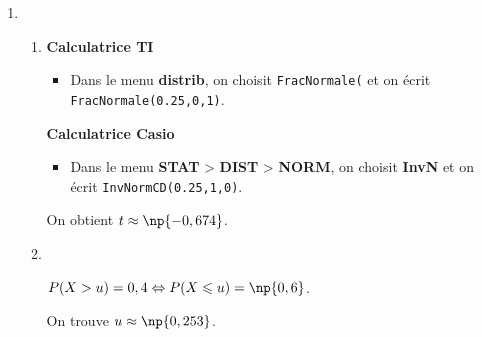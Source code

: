 \documentclass{cornouaille}
\begin{document}
\begin{methode}
\begin{enumerate}
\item
\begin{enumerate}
\item \begin{multicols}{2}
\textcolor{H1}{\bfseries Calculatrice TI}
\begin{itemize}
\item \raggedright%
  Dans le menu
  \textbf{distrib}, %
    on choisit \verb"FracNormale(" et on écrit \verb"FracNormale(0.25,0,1)".
\end{itemize}

\columnbreak

\textcolor{H1}{\bfseries Calculatrice Casio}
\begin{itemize}
  \item \raggedright Dans le menu %
    \textbf{STAT} > \textbf{DIST} > \textbf{NORM}, on choisit
    \textbf{InvN} et on écrit \verb"InvNormCD(0.25,1,0)".
\end{itemize}
\end{multicols}
On obtient $t\approx \np{-0,674}$.	
	\item ~~

\begin{minipage}{0.6\linewidth}
$P(X>u)=0,4 \Leftrightarrow P(X\leqslant u)=\np{0,6}$.

On trouve $u\approx \np{0,253}$.
\end{minipage}
\hfill
\begin{minipage}{0.4\linewidth}
\begin{center}
\end{center}
\end{minipage}
\end{enumerate}
\end{enumerate}

~~



~~
\end{methode}
\end{document}
